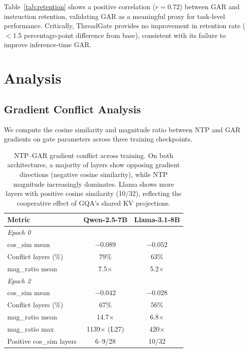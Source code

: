 \documentclass[11pt]{article}
\begin{document}
Table~\ref{tab:retention} shows a positive correlation ($r{=}0.72$) between GAR and instruction retention, validating GAR as a meaningful proxy for task-level performance.
Critically, ThreadGate provides no improvement in retention rate ($<$1.5 percentage-point difference from base), consistent with its failure to improve inference-time GAR.

\section{Analysis}
\label{sec:analysis}

\subsection{Gradient Conflict Analysis}

We compute the cosine similarity and magnitude ratio between NTP and GAR gradients on gate parameters across three training checkpoints.

\begin{table}[t]
\centering
\small
\begin{tabular}{lcc}
\toprule
\textbf{Metric} & \textbf{Qwen-2.5-7B} & \textbf{Llama-3.1-8B} \\
\midrule
\multicolumn{3}{l}{\emph{Epoch 0}} \\
\quad cos\_sim mean       & $-0.089$ & $-0.052$ \\
\quad Conflict layers (\%)& 79\%     & 63\% \\
\quad mag\_ratio mean     & 7.5$\times$  & 5.2$\times$ \\
\midrule
\multicolumn{3}{l}{\emph{Epoch 2}} \\
\quad cos\_sim mean       & $-0.042$ & $-0.028$ \\
\quad Conflict layers (\%)& 67\%     & 56\% \\
\quad mag\_ratio mean     & 14.7$\times$ & 6.8$\times$ \\
\quad mag\_ratio max      & 1139$\times$ (L27) & 420$\times$ \\
\midrule
Positive cos\_sim layers  & 6--9/28  & 10/32 \\
\bottomrule
\end{tabular}
\caption{NTP--GAR gradient conflict across training. On both architectures, a majority of layers show opposing gradient directions (negative cosine similarity), while NTP magnitude increasingly dominates. Llama shows more layers with positive cosine similarity (10/32), reflecting the cooperative effect of GQA's shared KV projections.}
\label{tab:gradient}
\end{table}
\end{document}

